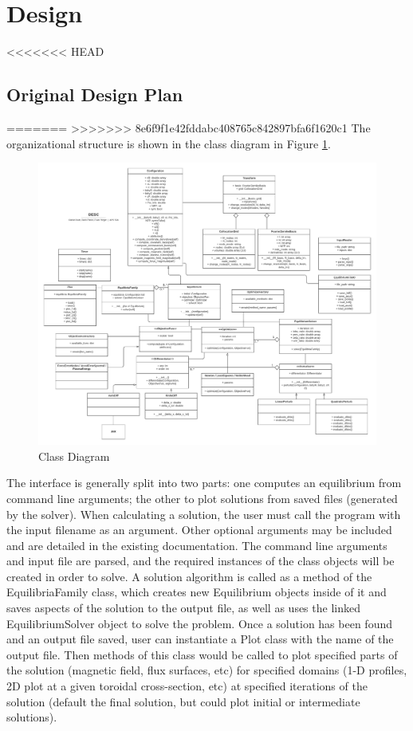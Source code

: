 \documentclass{article}
\begin{document}
\section{Design}

<<<<<<< HEAD
\subsection{Original Design Plan}

=======
>>>>>>> 8e6f9f1e42fddabc408765c842897bfa6f1620c1
The organizational structure is shown in the class diagram in Figure \ref{fig:uml}.
%
\begin{figure}[H]
  \centering
  \includegraphics[width=1.6\linewidth,center]{./figs/UML_06.pdf}
  \caption{Class Diagram}
  \label{fig:uml}
\end{figure}

The interface is generally split into two parts: one computes an equilibrium from command line arguments; the other to plot solutions from saved files (generated by the solver).
When calculating a solution, the user must call the program with the input filename as an argument. Other optional arguments may be included and are detailed in the existing documentation.
The command line arguments and input file are parsed, and the required instances of the class objects will be created in order to solve.
A solution algorithm is called as a method of the EquilibriaFamily class, which creates new Equilibrium objects inside of it and saves aspects of the solution to the output file, as well as uses the linked EquilibriumSolver object to solve the problem.
Once a solution has been found and an output file saved, user can instantiate a Plot class with the name of the output file.
Then methods of this class would be called to plot specified parts of the solution (magnetic field, flux surfaces, etc) for specified domains (1-D profiles, 2D plot at a given toroidal cross-section, etc) at specified iterations of the solution (default the final solution, but could plot initial or intermediate solutions).
\end{document}
